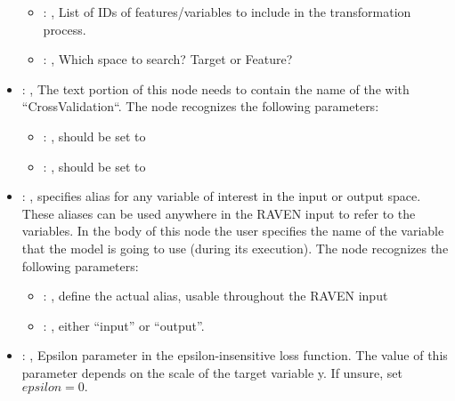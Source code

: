 \begin{itemize}
\begin{itemize}
        \item {}: , 
          List of IDs of features/variables to include in the transformation process.

        \item {}: , 
          Which space to search? Target or Feature?
      \end{itemize}

    \item {}: , 
      The text portion of this node needs to contain the name of the  with
               ``CrossValidation``.
      The  node recognizes the following parameters:
        \begin{itemize}
          \item {}: , 
            should be set to 
          \item {}: , 
            should be set to 
      \end{itemize}

    \item {}: , 
      specifies alias for         any variable of interest in the input or output space. These
      aliases can be used anywhere in the RAVEN input to         refer to the variables. In the body
      of this node the user specifies the name of the variable that the model is going to use
      (during its execution).
      The  node recognizes the following parameters:
        \begin{itemize}
          \item {}: , 
            define the actual alias, usable throughout the RAVEN input
          \item {}: , 
            either ``input'' or ``output''.
      \end{itemize}

    \item {}: , 
      Epsilon parameter in the epsilon-insensitive loss function. The value of
      this parameter depends on the scale of the target variable y. If unsure, set $epsilon=0.$


\end{itemize}
